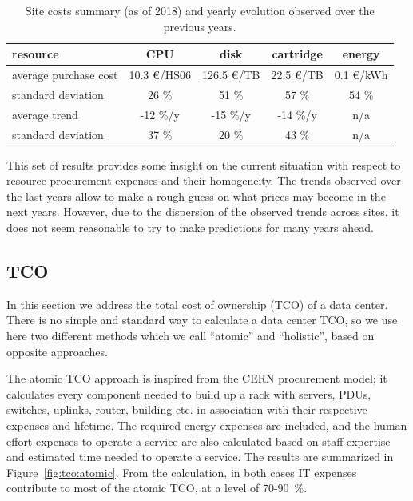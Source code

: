 \begin{table}[h]
    \centering
    \caption{Site costs summary (as of 2018) and yearly evolution observed over the previous years.}
    \label{tab:sitecosts}
    \begin{tabular}{lcccc}
        \hline
        resource & CPU & disk & cartridge & energy \\\hline
        average purchase cost & 10.3 \euro/HS06 & 126.5 \euro/TB & 22.5 \euro/TB & 0.1 \euro/kWh\\
        standard deviation & 26 \% & 51 \% & 57 \% & 54 \% \\
        average trend & -12 \%/y & -15 \%/y & -14 \%/y & n/a \\
        standard deviation & 37 \% & 20 \% & 43 \% & n/a \\\hline
    \end{tabular}
\end{table}


This set of results provides some insight on the current situation
with respect to resource procurement expenses and their
homogeneity. The trends observed over the last years allow to make a
rough guess on what prices may become in the next years. However, due
to the dispersion of the observed trends across sites, it does not seem
reasonable to try to make predictions for many years ahead.

\subsection{\label{sec:sitecost:tco}TCO}

In this section we address the total cost of ownership (TCO) of a data
center.  There is no simple and standard way to calculate a data
center TCO, so we use here two different methods which we call
``atomic'' and ``holistic'', based on opposite approaches.

The atomic TCO approach is inspired from the CERN procurement model;
it calculates every component needed to build up a rack with servers,
PDUs, switches, uplinks, router, building etc. in association with
their respective expenses and lifetime.  The required energy expenses
are included, and the human effort expenses to operate a service are
also calculated based on staff expertise and estimated time needed to
operate a service.  The results are summarized in
Figure~\ref{fig:tco:atomic}.  From the calculation, in both cases IT
expenses contribute to most of the atomic TCO, at a level of 70-90~\%.


